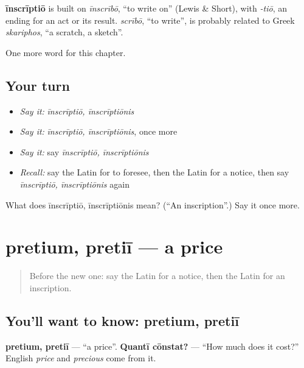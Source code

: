 \begin{cousinweb}
\textbf{īnscrīptiō} is built on \emph{īnscrībō}, \textquotedblleft{}to write on\textquotedblright{} (Lewis \& Short), with \emph{-tiō}, an ending for an act or its result. \emph{scrībō}, \textquotedblleft{}to write\textquotedblright{}, is probably related to Greek \emph{skariphos}, \textquotedblleft{}a scratch, a sketch\textquotedblright{}.
\end{cousinweb}

\begin{grammarlens}[title={What you've built}]
One more word for this chapter.
\end{grammarlens}

\subsection*{Your turn}
\begin{itemize}
\raggedright
  \item \emph{Say it:} \emph{īnscrīptiō, īnscrīptiōnis}
  \item \emph{Say it:} \emph{īnscrīptiō, īnscrīptiōnis}, once more
  \item \emph{Say it:} say \emph{īnscrīptiō, īnscrīptiōnis}
  \item \emph{Recall:} say the Latin for to foresee, then the Latin for a notice, then say \emph{īnscrīptiō, īnscrīptiōnis} again
\end{itemize}

\begin{tcolorbox}[breakable,colback=teal!4,colframe=teal!35!black,title={Before you move on}]
What does īnscrīptiō, īnscrīptiōnis mean? (\textquotedblleft{}An inscription\textquotedblright{}.) Say it once more.
\end{tcolorbox}
\section[pretium, pretiī]{pretium, pretiī — a price}

\label{lesson:LA-C164-pretium}



\begin{quote}
Before the new one: say the Latin for a notice, then the Latin for an inscription.
\end{quote}

\subsection*{You'll want to know: pretium, pretiī}
\textbf{pretium, pretiī} — \textquotedblleft{}a price\textquotedblright{}. \textbf{Quantī cōnstat?} — \textquotedblleft{}How much does it cost?\textquotedblright{} English \emph{price} and \emph{precious} come from it.

